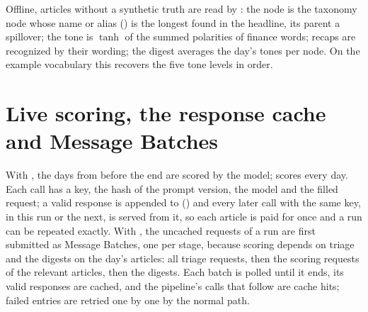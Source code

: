 Offline, articles without a synthetic truth are read by : the node is the taxonomy node whose
name or alias () is the longest found in the headline, its parent a spillover; the tone is
$\tanh$ of the summed polarities of finance words; recaps are recognized by their wording; the digest averages the day's
tones per node. On the example vocabulary this recovers the five tone levels in order.

\section{Live scoring, the response cache and Message Batches}
With , the days from  before the end are scored by the model;  scores every
day. Each call has a key, the hash of the prompt version, the model and the filled request; a valid response is
appended to  () and every later call with the same key, in this run or the
next, is served from it, so each article is paid for once and a run can be repeated exactly. With , the
uncached requests of a run are first submitted as Message Batches, one per stage, because scoring depends on triage and
the digests on the day's articles: all triage requests, then the scoring requests of the relevant articles, then the
digests. Each batch is polled until it ends, its valid responses are cached, and the pipeline's calls that follow are
cache hits; failed entries are retried one by one by the normal path.
\begin{codepointers}
\end{codepointers}

